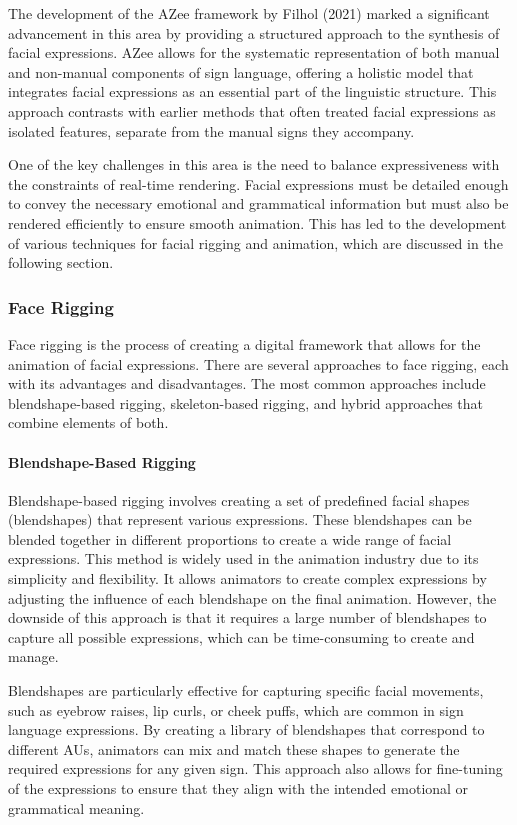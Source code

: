 \documentclass[../../main.tex]{subfiles}
\begin{document}
The development of the AZee framework by Filhol (2021) marked a significant advancement in this area by providing a structured approach to the synthesis of facial expressions. AZee allows for the systematic representation of both manual and non-manual components of sign language, offering a holistic model that integrates facial expressions as an essential part of the linguistic structure. This approach contrasts with earlier methods that often treated facial expressions as isolated features, separate from the manual signs they accompany.

One of the key challenges in this area is the need to balance expressiveness with the constraints of real-time rendering. Facial expressions must be detailed enough to convey the necessary emotional and grammatical information but must also be rendered efficiently to ensure smooth animation. This has led to the development of various techniques for facial rigging and animation, which are discussed in the following section.

\subsubsection{Face Rigging}

Face rigging is the process of creating a digital framework that allows for the animation of facial expressions. There are several approaches to face rigging, each with its advantages and disadvantages. The most common approaches include blendshape-based rigging, skeleton-based rigging, and hybrid approaches that combine elements of both.

\paragraph{Blendshape-Based Rigging}

Blendshape-based rigging involves creating a set of predefined facial shapes (blendshapes) that represent various expressions. These blendshapes can be blended together in different proportions to create a wide range of facial expressions. This method is widely used in the animation industry due to its simplicity and flexibility. It allows animators to create complex expressions by adjusting the influence of each blendshape on the final animation. However, the downside of this approach is that it requires a large number of blendshapes to capture all possible expressions, which can be time-consuming to create and manage.

Blendshapes are particularly effective for capturing specific facial movements, such as eyebrow raises, lip curls, or cheek puffs, which are common in sign language expressions. By creating a library of blendshapes that correspond to different AUs, animators can mix and match these shapes to generate the required expressions for any given sign. This approach also allows for fine-tuning of the expressions to ensure that they align with the intended emotional or grammatical meaning.
\end{document}
